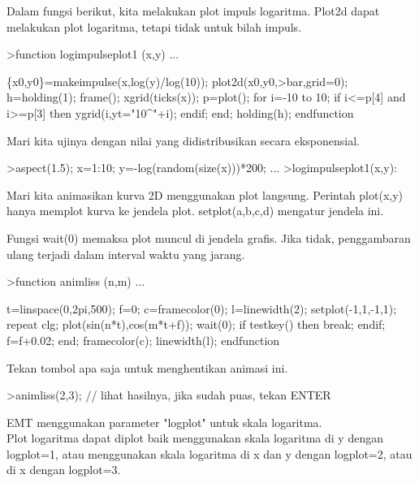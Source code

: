 \documentclass[a4paper,10pt]{article}
\begin{document}
\begin{eulernotebook}
\begin{eulercomment}
\begin{eulercomment}
\begin{eulercomment}
\begin{eulercomment}
\begin{eulercomment}
Dalam fungsi berikut, kita melakukan plot impuls logaritma. Plot2d
dapat melakukan plot logaritma, tetapi tidak untuk bilah impuls.
\end{eulercomment}
\begin{eulerprompt}
>function logimpulseplot1 (x,y) ...
\end{eulerprompt}
\begin{eulerudf}
    \{x0,y0\}=makeimpulse(x,log(y)/log(10));
    plot2d(x0,y0,>bar,grid=0);
    h=holding(1);
    frame();
    xgrid(ticks(x));
    p=plot();
    for i=-10 to 10;
      if i<=p[4] and i>=p[3] then
         ygrid(i,yt="10^"+i);
      endif;
    end;
    holding(h);
  endfunction
\end{eulerudf}
\begin{eulercomment}
Mari kita ujinya dengan nilai yang didistribusikan secara
eksponensial.
\end{eulercomment}
\begin{eulerprompt}
>aspect(1.5); x=1:10; y=-log(random(size(x)))*200; ...
>logimpulseplot1(x,y):
\end{eulerprompt}
\begin{eulercomment}
Mari kita animasikan kurva 2D menggunakan plot langsung. Perintah
plot(x,y) hanya memplot kurva ke jendela plot. setplot(a,b,c,d)
mengatur jendela ini.

Fungsi wait(0) memaksa plot muncul di jendela grafis. Jika tidak,
penggambaran ulang terjadi dalam interval waktu yang jarang.
\end{eulercomment}
\begin{eulerprompt}
>function animliss (n,m) ...
\end{eulerprompt}
\begin{eulerudf}
  t=linspace(0,2pi,500);
  f=0;
  c=framecolor(0);
  l=linewidth(2);
  setplot(-1,1,-1,1);
  repeat
    clg;
    plot(sin(n*t),cos(m*t+f));
    wait(0);
    if testkey() then break; endif;
    f=f+0.02;
  end;
  framecolor(c);
  linewidth(l);
  endfunction
\end{eulerudf}
\begin{eulercomment}
Tekan tombol apa saja untuk menghentikan animasi ini.
\end{eulercomment}
\begin{eulerprompt}
>animliss(2,3); // lihat hasilnya, jika sudah puas, tekan ENTER
\end{eulerprompt}
\begin{eulercomment}
EMT menggunakan parameter "logplot" untuk skala logaritma.\\
Plot logaritma dapat diplot baik menggunakan skala logaritma di y
dengan logplot=1, atau menggunakan skala logaritma di x dan y dengan
logplot=2, atau di x dengan logplot=3.


\end{eulercomment}
\end{eulercomment}
\end{eulercomment}
\end{eulercomment}
\end{eulercomment}
\end{eulernotebook}
\end{document}
